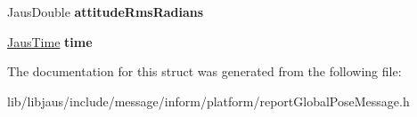 \begin{DoxyCompactItemize}
\item 
\hypertarget{struct_report_global_pose_message_struct_ab3bcfab8e4c11b9926f0de12b3472993}{\-Jaus\-Double {\bfseries attitude\-Rms\-Radians}}\label{struct_report_global_pose_message_struct_ab3bcfab8e4c11b9926f0de12b3472993}

\item 
\hypertarget{struct_report_global_pose_message_struct_a964f24fe1c01282dc17dd556effffee0}{\hyperlink{struct_jaus_time_struct}{\-Jaus\-Time} {\bfseries time}}\label{struct_report_global_pose_message_struct_a964f24fe1c01282dc17dd556effffee0}

\end{DoxyCompactItemize}


\-The documentation for this struct was generated from the following file\-:\begin{DoxyCompactItemize}
\item 
lib/libjaus/include/message/inform/platform/report\-Global\-Pose\-Message.\-h\end{DoxyCompactItemize}
